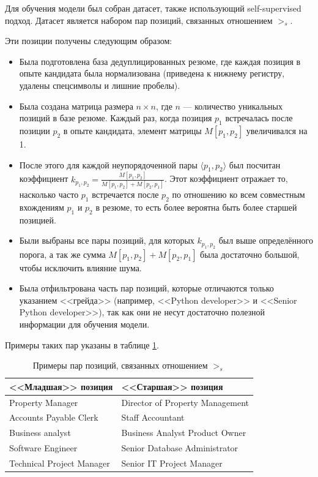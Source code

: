 \documentclass[14pt]{mmcs_article}
\begin{document}
Для обучения модели был собран датасет, также использующий self-supervised подход. Датасет является набором пар позиций, связанных отношением $>_{s}$.

Эти позиции получены следующим образом:

\begin{itemize}
  \item Была подготовлена база дедуплицированных резюме, где каждая позиция в опыте кандидата была нормализована (приведена к нижнему регистру, удалены спецсимволы и лишние пробелы).
  \item Была создана матрица размера $n \times n$, где $n$ --- количество уникальных позиций в базе резюме. Каждый раз, когда позиция $p_1$ встречалась после позиции $p_2$ в опыте кандидата, элемент матрицы $M[p_1, p_2]$ увеличивался на 1.
  \item После этого для каждой неупорядоченной пары $\langle p_1, p_2 \rangle$ был посчитан коэффициент $k_{p_1, p_2} = \frac{M[p_1, p_2]}{M[p_1, p_2] + M[p_2, p_1]}$. Этот коэффициент отражает то, насколько часто $p_1$ встречается после $p_2$ по отношению ко всем совместным вхождениям $p_1$ и $p_2$ в резюме, то есть более вероятна быть более старшей позицией.
  \item Были выбраны все пары позиций, для которых $k_{p_1, p_2}$ был выше определённого порога, а так же сумма $M[p_1, p_2] + M[p_2, p_1]$ была достаточно большой, чтобы исключить влияние шума.
  \item Была отфильтрована часть пар позиций, которые отличаются только указанием <<грейда>> (например, <<Python developer>> и <<Senior Python developer>>), так как они не несут достаточно полезной информации для обучения модели.
\end{itemize}

Примеры таких пар указаны в таблице \ref{tab:seniority_pairs}.

\begin{table}[H]
  \centering
  \caption{\centering Примеры пар позиций, связанных отношением $>_{s}$}
  \label{tab:seniority_pairs}
  \begin{tabular}{|l|l|}
    \hline
    \textbf{<<Младшая>> позиция} & \textbf{<<Старшая>> позиция}    \\
    \hline
    Property Manager             & Director of Property Management \\
    \hline
    Accounts Payable Clerk       & Staff Accountant                \\
    \hline
    Business analyst             & Business Analyst Product Owner  \\
    \hline
    Software Engineer            & Senior Database Administrator   \\
    \hline
    Technical Project Manager    & Senior IT Project Manager       \\
    \hline
  \end{tabular}
\end{table}
\end{document}
